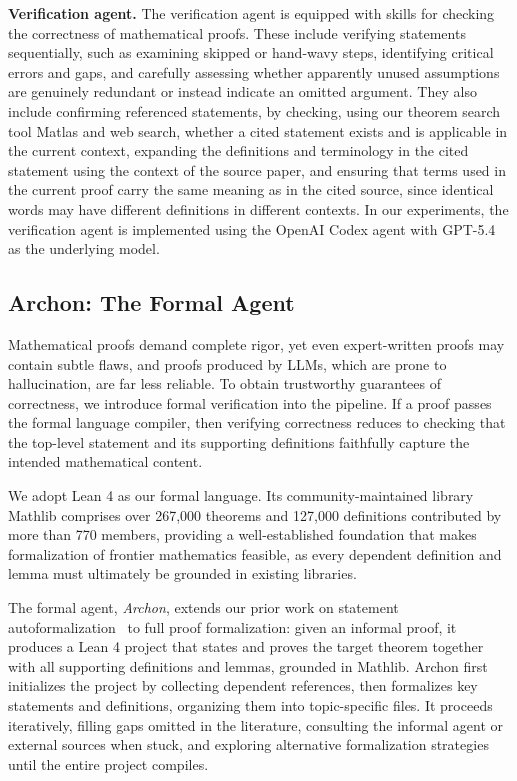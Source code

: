 \documentclass[]{pkuai4m}
\theoremstyle{plain}
\theoremstyle{definition}
\begin{document}
\textbf{Verification agent.} The verification agent is equipped with skills for checking the correctness of mathematical proofs. These include verifying statements sequentially, such as examining skipped or hand-wavy steps, identifying critical errors and gaps, and carefully assessing whether apparently unused assumptions are genuinely redundant or instead indicate an omitted argument. They also include confirming referenced statements, by checking, using our theorem search tool Matlas and web search, whether a cited statement exists and is applicable in the current context, expanding the definitions and terminology in the cited statement using the context of the source paper, and ensuring that terms used in the current proof carry the same meaning as in the cited source, since identical words may have different definitions in different contexts. In our experiments, the verification agent is implemented using the OpenAI Codex agent with GPT-5.4 as the underlying model.






\subsection{Archon: The Formal Agent}\label{subsec:archon}

Mathematical proofs demand complete rigor, yet even expert-written proofs may contain subtle flaws, and proofs produced by LLMs, which are prone to hallucination, are far less reliable. To obtain trustworthy guarantees of correctness, we introduce formal verification into the pipeline. If a proof passes the formal language compiler, then verifying correctness reduces to checking that the top-level statement and its supporting definitions faithfully capture the intended mathematical content.

We adopt Lean 4 as our formal language. Its community-maintained library Mathlib comprises over 267,000 theorems and 127,000 definitions contributed by more than 770 members, providing a well-established foundation that makes formalization of frontier mathematics feasible, as every dependent definition and lemma must ultimately be grounded in existing libraries.

The formal agent, \textit{Archon}, extends our prior work on statement autoformalization~\cite{gao2024herald, wang2025aria} to full proof formalization: given an informal proof, it produces a Lean 4 project that states and proves the target theorem together with all supporting definitions and lemmas, grounded in Mathlib.
Archon first initializes the project by collecting dependent references, then formalizes key statements and definitions, organizing them into topic-specific files. It proceeds iteratively, filling gaps omitted in the literature, consulting the informal agent or external sources when stuck, and exploring alternative formalization strategies until the entire project compiles.
\end{document}
